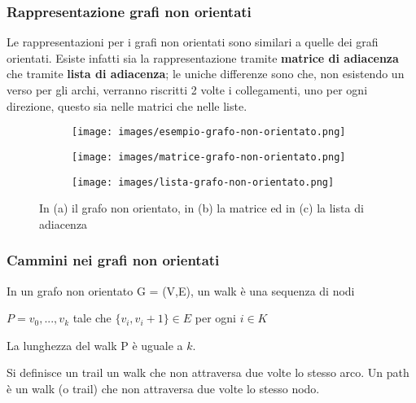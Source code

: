 \subsubsection{Rappresentazione grafi non orientati}
Le rappresentazioni per i grafi non orientati sono similari a quelle dei grafi orientati. Esiste infatti sia la rappresentazione tramite \textbf{matrice di adiacenza} che tramite \textbf{lista di adiacenza}; le uniche differenze sono che, non esistendo un verso per gli archi, verranno riscritti 2 volte i collegamenti, uno per ogni direzione, questo sia nelle matrici che nelle liste.
\begin{figure}[h!]
    \centering
    \begin{subfigure}{.3\textwidth}
        \centering
        \texttt{[image: images/esempio-grafo-non-orientato.png]}
        \caption{}
    \end{subfigure}
    \hfill
    \begin{subfigure}{.3\textwidth}
        \centering
        \texttt{[image: images/matrice-grafo-non-orientato.png]}
        \caption{}
    \end{subfigure}
    \hfill
    \begin{subfigure}{.3\textwidth}
        \centering
        \texttt{[image: images/lista-grafo-non-orientato.png]}
        \caption{}
    \end{subfigure}
    \vspace{-5pt}
    \caption{In (a) il grafo non orientato, in (b) la matrice ed in (c) la lista di adiacenza}
\end{figure}

\subsubsection{Cammini nei grafi non orientati}
\begin{definition}[Walk]
    In un grafo non orientato G = (V,E), un walk è una sequenza di nodi
    \begin{center}
        $P = v_0, ..., v_k$ tale che $\{v_i, v_i+1\} \in E$ per ogni $i \in K$
    \end{center}
    La lunghezza del walk P è uguale a $k$.
\end{definition}

\begin{definition}
    Si definisce un trail un walk che non attraversa due volte lo stesso arco. Un path è un walk (o trail) che non attraversa due volte lo stesso nodo.
\end{definition}

